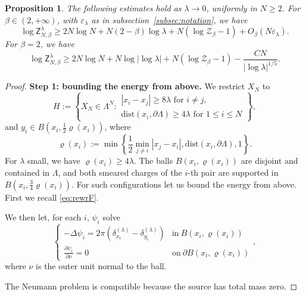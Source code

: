 \documentclass[a4paper,10pt,leqno]{amsart}
\numberwithin{equation}{section}
\newtheorem{prop}{Proposition}[section]
\def\hal{\frac{1}{2}}
\def\mc{\mathcal}
\def\dist{\mathrm{dist}}
\def\Z{\mathsf{Z}_{N,\beta}^{\lambda}}
\begin{document}
\begin{prop}\label{prop:lower bound}
  The following estimates hold as $\lambda\to0$, uniformly in $N\ge2$.
  For $\beta \in (2,+\infty)$, with $\varepsilon_\lambda$ as in subsection~\ref{subsec:notation}, we have
  \begin{equation}\label{lbz}
    \log \Z
    \ge 2N \log N + N(2-\beta) \log \lambda+N(\log \mc{Z}_{\beta}-1)+O_\beta(N\varepsilon_\lambda).
  \end{equation}
  For $\beta=2$, we have
  \begin{equation}\label{eq:lbz2}
    \log \Z\geq 2N\log N+N\log|\log \lambda|+N(\log \mc{Z}_\beta-1)-\frac{CN}{|\log\lambda|^{1/5}}.
  \end{equation}
\end{prop}

\begin{proof}
  \textbf{Step 1: bounding the energy from above.}
  We restrict $X_N$ to
  \[
    H:=\left\{X_N\in\Lambda^N:\begin{array}{l}
      |x_i-x_j|\ge8\lambda\text{ for }i\ne j,\\
      \dist(x_i,\partial\Lambda)\ge4\lambda\text{ for }1\le i\le N
    \end{array}\right\},
  \]
  and $y_i\in B(x_i,\hal\varrho(x_i))$, where
  \[
    \varrho(x_i):=\min\left\{\hal\min_{j\ne i}|x_j-x_i|,\dist(x_i,\partial\Lambda),1\right\}.
  \]
  For $\lambda$ small, we have $\varrho(x_i)\ge4\lambda$. The balls $B(x_i,\varrho(x_i))$ are disjoint and contained in $\Lambda$, and both smeared charges of the $i$-th pair are supported in $B(x_i,\frac34\varrho(x_i))$.
  For such configurations let us bound the energy from above. First we recall \eqref{eq:rewrF}.

  We then let, for each $i$, $\psi_i$ solve
  \[\left\{ \begin{array}{ll}
    -\Delta \psi_i= 2\pi (\delta_{x_i}^{(\lambda)} -\delta_{y_i}^{(\lambda)} )& \text{in} \ B(x_i, \varrho(x_i))\\
    \frac{\partial \psi_i}{\partial \nu}= 0 & \text{on} \ \partial B(x_i, \varrho(x_i))\end{array}\right.,
  \]
  where $\nu$ is the outer unit normal to the ball.

  The Neumann problem is compatible because the source has total mass zero.


\end{proof}
\end{document}
